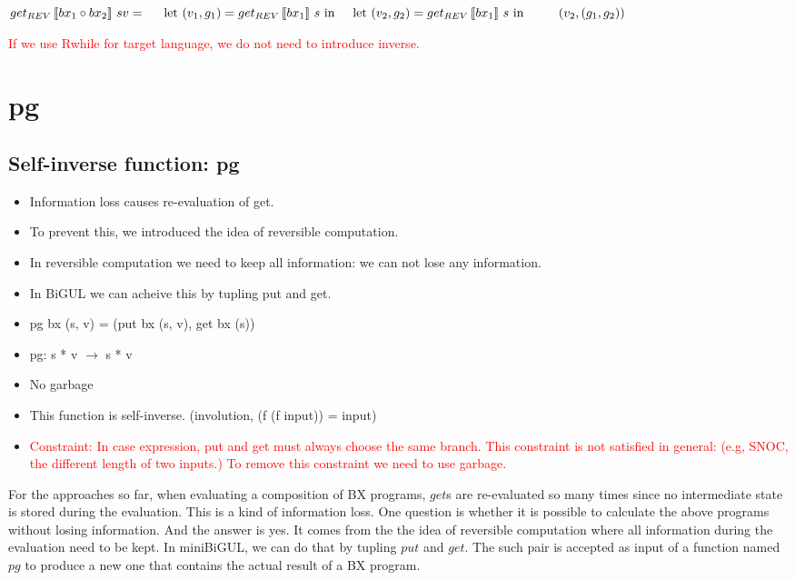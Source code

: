 \documentclass[runningheads]{llncs}
\newcommand{\tab}{\hspace*{5mm}}
\newcommand{\qtab}{\hspace*{5mm} \ \quad}
\newcommand{\getrev}[2]{get_{REV} \, [\![#1]\!] \ {#2}}
\begin{document}
$\getrev{bx_1 \circ bx_2}{s}{v} =\\
    \tab \text{let} \ (v_1, g_1) = \getrev{bx_1}{s} \ \text{in}\\
    \tab \text{let} \ (v_2, g_2) = \getrev{bx_1}{s} \ \text{in}\\
        \qtab (v_2, (g_1, g_2))$

\textcolor{red}{If we use Rwhile for target language, we do not need to introduce inverse.}

\section{pg}
\subsection{Self-inverse function: pg}

\begin{itemize}
\item Information loss causes re-evaluation of get.
\item To prevent this, we introduced the idea of reversible computation.
\item In reversible computation we need to keep all information: we can not lose any information.
\item In BiGUL we can acheive this by tupling put and get.
\item pg bx (s, v) = (put bx (s, v), get bx (s))
\item pg: s * v $\to$ s * v
\item No garbage
\item This function is self-inverse. (involution, (f (f input)) = input)
\item \textcolor{red}{Constraint: In case expression, put and get must always choose the same branch. This constraint is not satisfied in general: (e.g, SNOC, the different length of two inputs.) To remove this constraint we need to use garbage.}
\end{itemize}

For the approaches so far, when evaluating a composition of BX programs, $get$s are re-evaluated so many times since no intermediate state is stored during the evaluation. This is a kind of information loss. One question is whether it is possible to calculate the above programs without losing information. And the answer is yes. It comes from the the idea of reversible computation where all information during the evaluation need to be kept. In miniBiGUL, we can do that by tupling $put$ and $get$. The such pair is accepted as input of a function named $pg$ to produce a new one that contains the actual result of a BX program.
\end{document}
